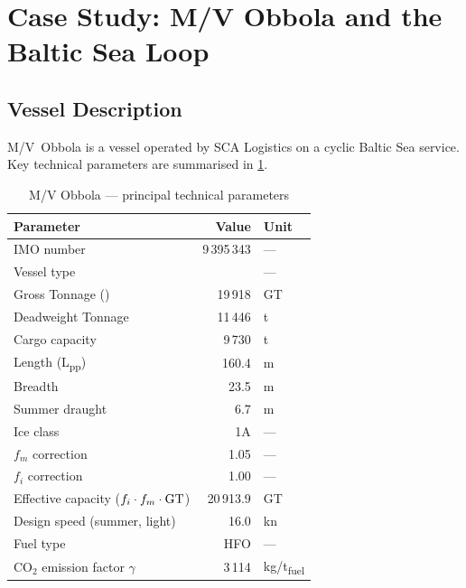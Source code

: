 \section{Case Study: M/V Obbola and the Baltic Sea Loop}
\label{ch:casestudy}

\subsection{Vessel Description}
\label{sec:case:vessel}

M/V~Obbola is a \RoRo{} vessel operated by SCA Logistics on a cyclic
Baltic Sea service. Key technical parameters are summarised in
\cref{tab:vessel_params}.

\begin{table}[h]
\centering
\caption{M/V Obbola — principal technical parameters}
\label{tab:vessel_params}
\begin{tabular}{lrl}
  \toprule
  Parameter & Value & Unit \\
  \midrule
  IMO number            & 9\,395\,343 & --- \\
  Vessel type           & \RoRo{}     & --- \\
  Gross Tonnage (\GT{}) & 19\,918     & GT \\
  Deadweight Tonnage    & 11\,446     & t \\
  Cargo capacity        & 9\,730      & t \\
  Length (L\textsubscript{pp}) & 160.4 & m \\
  Breadth               & 23.5        & m \\
  Summer draught        & 6.7         & m \\
  Ice class             & 1A          & --- \\
  $f_m$ correction      & 1.05        & --- \\
  $f_i$ correction      & 1.00        & --- \\
  Effective capacity ($f_i \cdot f_m \cdot \mathrm{GT}{}$)
                        & 20\,913.9   & GT \\
  Design speed (summer, light) & 16.0 & kn \\
  Fuel type             & HFO         & --- \\
  CO$_2$ emission factor $\gamma$ & 3\,114 & kg/t\textsubscript{fuel} \\
  \bottomrule
\end{tabular}
\end{table}

